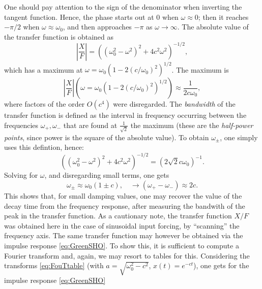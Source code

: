 \documentclass[11pt,twoside,a4paper,english]{book}
\newcommand{\virg}[1]{``#1''}
\begin{document}
One should pay attention to the sign of the denominator when inverting the tangent function. Hence, the phase starts out at $0$ when $\omega \approx 0$; then it reaches $-\pi/2$ when $\omega \approx \omega_0$, and then approaches $-\pi$ as $\omega \rightarrow \infty$. The absolute value of the transfer function is obtained as
\begin{equation}\label{eq:XFlinearOsc}
    \left|\frac{X}{F}\right|  = \left((\omega_0^2-\omega^2)^2+4c^2\omega^2\right)^{-1/2},
\end{equation}
which has a maximum at $\omega = \omega_0 \left(1-2(c/\omega_0)^2 \right)^{1/2}$. The maximum is 
\begin{equation}
    \left|\frac{X}{F}\right|(\omega = \omega_0 \left(1-2(c/\omega_0)^2 \right)^{1/2}) \approx \frac{1}{2c\omega_0},
\end{equation}
where factors of the order $O(c^4)$ were disregarded. The \emph{bandwidth} of the transfer function is defined as the interval in frequency occurring between the frequencies $\omega_+,\omega_-$ that are found at $\frac{1}{\sqrt{2}}$ the maximum (these are the \emph{half-power points}, since power is the square of the absolute value). To obtain $\omega_\pm$, one simply uses this defintion, hence:
\begin{equation}
    \left((\omega_0^2-\omega^2)^2+4c^2\omega^2\right)^{-1/2} = \left(2\sqrt{2} c\omega_0\right)^{-1}.
\end{equation}
Solving for $\omega$, and disregarding small terms, one gets
\begin{equation}
    \omega_\pm \approx \omega_0\left(1 \pm {c} \right), \quad \rightarrow (\omega_+ - \omega_-) \approx 2c.
\end{equation}
This shows that, for small damping values, one may recover the value of the decay time from the frequency response, after measuring the bandwith of the peak in the transfer function. As a cautionary note, the transfer function $X/F$ was obtained here in the case of sinusoidal input forcing, by \virg{scanning} the frequency axis. The same transfer function may however be obtained via the impulse response \eqref{eq:GreenSHO}. To show this, it is sufficient to compute a Fourier transform and, again, we may resort to tables for this. Considering the transforms \eqref{eq:FouTtable} (with $a = \sqrt{\omega_0^2 - c^2}$, $x(t) = e^{-ct}$), one gets for the impulse response \eqref{eq:GreenSHO}
\end{document}
